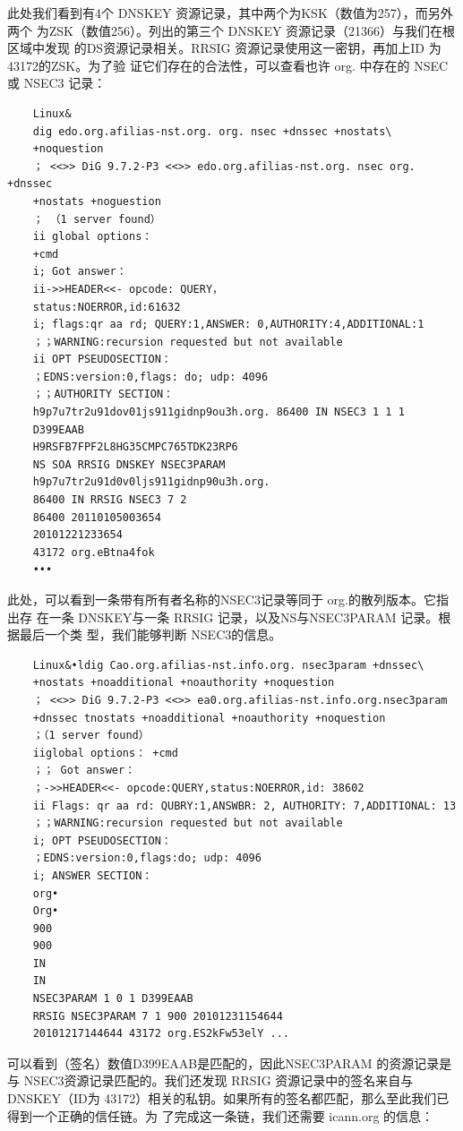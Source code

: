 此处我们看到有4个 DNSKEY 资源记录，其中两个为KSK（数值为257），而另外两个
为ZSK（数值256）。列出的第三个 DNSKEY 资源记录（21366）与我们在根区域中发现
的DS资源记录相关。RRSIG 资源记录使用这一密钥，再加上ID 为43172的ZSK。为了验
证它们存在的合法性，可以查看也许 org. 中存在的 NSEC或 NSEC3 记录：
\begin{verbatim}
    Linux&
    dig edo.org.afilias-nst.org. org. nsec +dnssec +nostats\
    +noquestion
    ； <<>> DiG 9.7.2-P3 <<>> edo.org.afilias-nst.org. nsec org. +dnssec
    +nostats +noguestion
    ； （1 server found）
    ii global options：
    +cmd
    i; Got answer：
    ii->>HEADER<<- opcode: QUERY，
    status:NOERROR,id:61632
    i; flags:qr aa rd; QUERY:1,ANSWER: 0,AUTHORITY:4,ADDITIONAL:1
    ；；WARNING:recursion requested but not available
    ii OPT PSEUDOSECTION：
    ；EDNS:version:0,flags: do; udp: 4096
    ；；AUTHORITY SECTION：
    h9p7u7tr2u91dov01js911gidnp9ou3h.org. 86400 IN NSEC3 1 1 1
    D399EAAB
    H9RSFB7FPF2L8HG35CMPC765TDK23RP6
    NS SOA RRSIG DNSKEY NSEC3PARAM
    h9p7u7tr2u91d0v0ljs911gidnp90u3h.org.
    86400 IN RRSIG NSEC3 7 2
    86400 20110105003654
    20101221233654
    43172 org.eBtna4fok
    •••
\end{verbatim}
此处，可以看到一条带有所有者名称的NSEC3记录等同于 org.的散列版本。它指出存
在一条 DNSKEY与一条 RRSIG 记录，以及NS与NSEC3PARAM 记录。根据最后一个类
型，我们能够判断 NSEC3的信息。
\begin{verbatim}
    Linux&•ldig Cao.org.afilias-nst.info.org. nsec3param +dnssec\
    +nostats +noadditional +noauthority +noquestion
    ； <<>> DiG 9.7.2-P3 <<>> ea0.org.afilias-nst.info.org.nsec3param
    +dnssec tnostats +noadditional +noauthority +noquestion
    ；（1 server found）
    iiglobal options： +cmd
    ；； Got answer：
    ；->>HEADER<<- opcode:QUERY,status:NOERROR,id: 38602
    ii Flags: qr aa rd: QUBRY:1,ANSWBR: 2, AUTHORITY: 7,ADDITIONAL: 13
    ；；WARNING:recursion requested but not available
    i; OPT PSEUDOSECTION：
    ；EDNS:version:0,flags:do; udp: 4096
    i; ANSWER SECTION：
    org•
    Org•
    900
    900
    IN
    IN
    NSEC3PARAM 1 0 1 D399EAAB
    RRSIG NSEC3PARAM 7 1 900 20101231154644
    20101217144644 43172 org.ES2kFw53elY ...
\end{verbatim}
可以看到（签名）数值D399EAAB是匹配的，因此NSEC3PARAM 的资源记录是与
NSEC3资源记录匹配的。我们还发现 RRSIG 资源记录中的签名来自与DNSKEY（ID为
43172）相关的私钥。如果所有的签名都匹配，那么至此我们已得到一个正确的信任链。为
了完成这一条链，我们还需要 icann.org 的信息：
